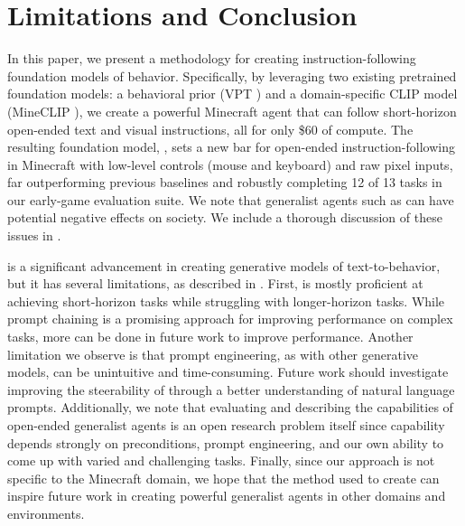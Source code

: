 \section{Limitations and Conclusion}

In this paper, we present a methodology for creating instruction-following foundation models of behavior. Specifically, by leveraging two existing pretrained foundation models: a behavioral prior (VPT \citep{baker2022vpt}) and a domain-specific CLIP model (MineCLIP \citep{fan2022minedojo}), we create a powerful Minecraft agent that can follow short-horizon open-ended text and visual instructions, all for only \$60 of compute. The resulting foundation model, \agentname{}, sets a new bar for open-ended instruction-following in Minecraft with low-level controls (mouse and keyboard) and raw pixel inputs, far outperforming previous baselines and robustly completing 12 of 13 tasks in our early-game evaluation suite. We note that generalist agents such as \agentname{} can have potential negative effects on society. We include a thorough discussion of these issues in .

\agentname{} is a significant advancement in creating generative models of text-to-behavior, but it has several limitations, as described in . First, \agentname{} is mostly proficient at achieving short-horizon tasks while struggling with longer-horizon tasks. While prompt chaining is a promising approach for improving performance on complex tasks, more can be done in future work to improve performance. Another limitation we observe is that prompt engineering, as with other generative models, can be unintuitive and time-consuming. Future work should investigate improving the steerability of \agentname{} through a better understanding of natural language prompts. Additionally, we note that evaluating and describing the capabilities of open-ended generalist agents is an open research problem itself since capability depends strongly on preconditions, prompt engineering, and our own ability to come up with varied and challenging tasks. Finally, since our approach is not specific to the Minecraft domain, we hope that the method used to create \agentname{} can inspire future work in creating powerful generalist agents in other domains and environments.

